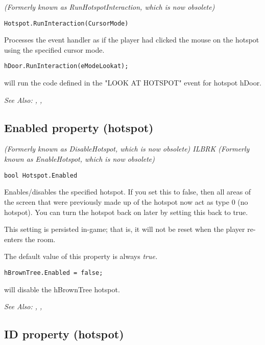 \it{(Formerly known as RunHotspotInteraction, which is now obsolete)}

\begin{verbatim}
Hotspot.RunInteraction(CursorMode)
\end{verbatim}
Processes the event handler as if the player had clicked the mouse
on the hotspot using the specified cursor mode.

\begin{verbatim}
hDoor.RunInteraction(eModeLookat);
\end{verbatim}
will run the code defined in the "LOOK AT HOTSPOT" event for hotspot hDoor.

\it{See Also:} ,
,


\subsection{Enabled property (hotspot)}\label{Hotspot.Enabled}%

\it{(Formerly known as DisableHotspot, which is now obsolete)} ILBRK
\it{(Formerly known as EnableHotspot, which is now obsolete)}

\begin{verbatim}
bool Hotspot.Enabled
\end{verbatim}
Enables/disables the specified hotspot. If you set this to false, then all areas of the screen
that were previously made up of the hotspot now act as type 0 (no hotspot). You can turn the
hotspot back on later by setting this back to true.

This setting is persisted in-game; that is, it will not be reset when the player
re-enters the room.

The default value of this property is always \it{true}.

\begin{verbatim}
hBrownTree.Enabled = false;
\end{verbatim}
will disable the hBrownTree hotspot.

\it{See Also:} ,
,


\subsection{ID property (hotspot)}\label{Hotspot.ID}%

